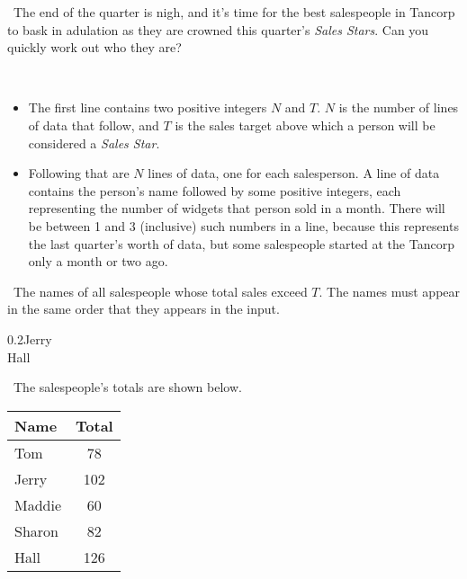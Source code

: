 

\Question\ The end of the quarter is nigh, and it's time for the best salespeople in
\textsf{Tancorp} to bask in adulation as they are crowned this quarter's \emph{Sales
Stars}. Can you quickly work out who they are?

\Input\

\begin{itemize}
  \item The first line contains two positive integers $N$ and $T$. $N$ is the number of
    lines of data that follow, and $T$ is the sales target above which a person will be
    considered a \emph{Sales Star}.
  \item Following that are $N$ lines of data, one for each salesperson. A line of data
    contains the person's name followed by some positive integers, each representing the
    number of widgets that person sold in a month. There will be between 1 and 3
    (inclusive) such numbers in a line, because this represents the last quarter's worth
    of data, but some salespeople started at the \textsf{Tancorp} only a month or two ago.
\end{itemize}

\Output\ The names of all salespeople whose total sales exceed $T$. The names must appear
in the same order that they appears in the input.

\Sample

       {0.2}{Jerry\\Hall}

\Explanation\ The salespeople's totals are shown below.

\begin{inlinetable}
  \begin{tabular}{lS[table-format=3.0]}
    \toprule
    Name   & Total \\
    \midrule
    Tom    & 78    \\
    Jerry  & 102   \\
    Maddie & 60    \\
    Sharon & 82    \\
    Hall   & 126   \\
    \bottomrule
  \end{tabular}
\end{inlinetable}


